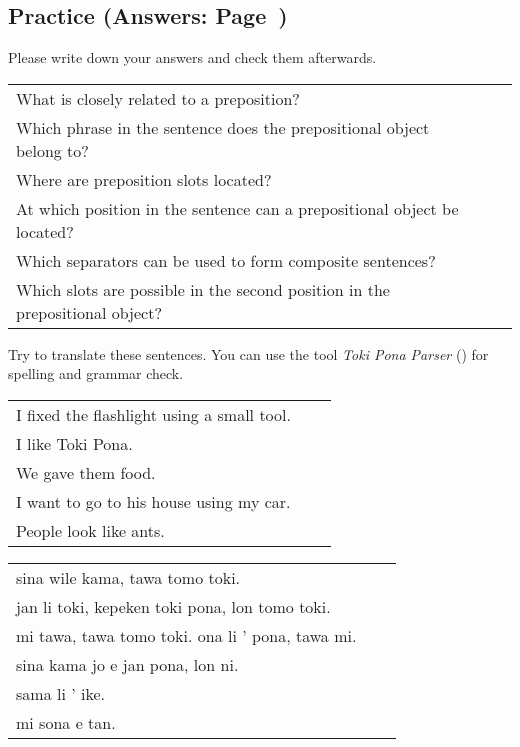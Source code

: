 %
\newpage
%
\subsection*{Practice (Answers: Page~\pageref{'prepositional_objects'})}
%
Please write down your answers and check them afterwards. 

\begin{supertabular}{p{5,5cm}|ll}
What is closely related to a preposition?  &&  \\ %
Which phrase in the sentence does the prepositional object belong to?  &&   \\ %
Where are preposition slots located?  &&   \\ %
At which position in the sentence can a prepositional object be located? &&  \\ %
Which separators can be used to form composite sentences?  &&   \\ %
Which slots are possible in the second position in the prepositional object?  &&   \\ %
\end{supertabular}

Try to translate these sentences. 
You can use the tool \textit{Toki Pona Parser} (\cite{www:rowa:02}) for spelling and grammar check. 

\begin{supertabular}{p{5,5cm}|ll}
I fixed the flashlight using a small tool.  &&  \\  %
I like Toki Pona.  &&  \\  %
We gave them food.  &&  \\ %
I want to go to his house using my car.  &&  \\  %
People look like ants. && \\ %
\end{supertabular}

\begin{supertabular}{p{5,5cm}|ll}
sina wile kama, tawa tomo toki.  &&  \\ %
jan li toki, kepeken toki pona, lon tomo toki.  &&  \\ %
mi tawa, tawa tomo toki. ona li ' pona, tawa mi.  &&  \\ %
sina kama jo e jan pona, lon ni.  &&  \\ %
sama li ' ike. &&  \\ %
mi sona e tan. &&  \\ %
\end{supertabular} 

%
